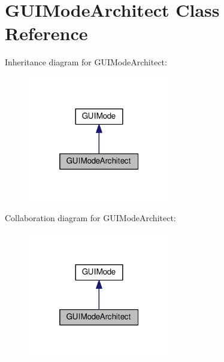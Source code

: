 \hypertarget{classGUIModeArchitect}{\section{G\-U\-I\-Mode\-Architect Class Reference}
\label{classGUIModeArchitect}
}


Inheritance diagram for G\-U\-I\-Mode\-Architect\-:
\nopagebreak
\begin{figure}[H]
\begin{center}
\leavevmode
\includegraphics[width=176pt]{classGUIModeArchitect__inherit__graph}
\end{center}
\end{figure}


Collaboration diagram for G\-U\-I\-Mode\-Architect\-:
\nopagebreak
\begin{figure}[H]
\begin{center}
\leavevmode
\includegraphics[width=176pt]{classGUIModeArchitect__coll__graph}
\end{center}
\end{figure}
